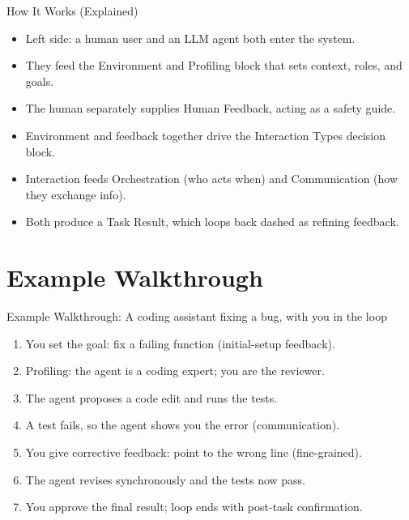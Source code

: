 \documentclass[10pt]{beamer}
\begin{document}
\begin{frame}[allowframebreaks]{How It Works (Explained)}
\begin{itemize}
  \item Left side: a human user and an LLM agent both enter the system.
  \item They feed the Environment and Profiling block that sets context, roles, and goals.
  \item The human separately supplies Human Feedback, acting as a safety guide.
  \item Environment and feedback together drive the Interaction Types decision block.
  \item Interaction feeds Orchestration (who acts when) and Communication (how they exchange info).
  \item Both produce a Task Result, which loops back dashed as refining feedback.
\end{itemize}
\end{frame}
\section{Example Walkthrough}
\begin{frame}[allowframebreaks]{Example Walkthrough: A coding assistant fixing a bug, with you in the loop}
\begin{enumerate}
  \item You set the goal: fix a failing function (initial-setup feedback).
  \item Profiling: the agent is a coding expert; you are the reviewer.
  \item The agent proposes a code edit and runs the tests.
  \item A test fails, so the agent shows you the error (communication).
  \item You give corrective feedback: point to the wrong line (fine-grained).
  \item The agent revises synchronously and the tests now pass.
  \item You approve the final result; loop ends with post-task confirmation.
\end{enumerate}
\end{frame}
\end{document}
